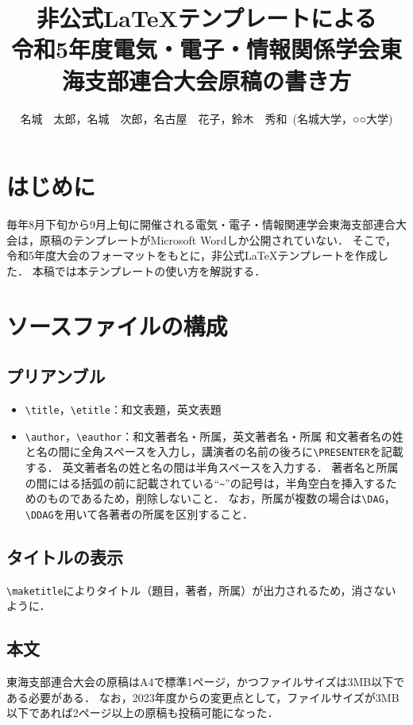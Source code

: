 \documentclass[a4j,9pt,twocolumn,uplatex]{jsarticle}
\title{非公式\LaTeX テンプレートによる\\令和5年度電気・電子・情報関係学会東海支部連合大会原稿の書き方}
\author{名城　太郎\DAG\PRESENTER，名城　次郎\DAG，名古屋　花子\DDAG，鈴木　秀和\DAG~(\DAG 名城大学，\DDAG ○○大学)}
\begin{document}
\maketitle		%

\setlength{\baselineskip}{14pt} %


\section{はじめに}

毎年8月下旬から9月上旬に開催される電気・電子・情報関連学会東海支部連合大会は，原稿のテンプレートがMicrosoft Wordしか公開されていない．
そこで，令和5年度大会のフォーマットをもとに，非公式\LaTeX テンプレートを作成した．
本稿では本テンプレートの使い方を解説する．


\section{ソースファイルの構成}

\subsection{プリアンブル}
\begin{itemize}
    \item \verb|\title|，\verb|\etitle|：和文表題，英文表題
    \item \verb|\author|，\verb|\eauthor|：和文著者名・所属，英文著者名・所属
    和文著者名の姓と名の間に全角スペースを入力し，講演者の名前の後ろに\verb|\PRESENTER|を記載する．
    英文著者名の姓と名の間は半角スペースを入力する．
    著者名と所属の間にはる括弧の前に記載されている``\verb|~|''の記号は，半角空白を挿入するためのものであるため，削除しないこと．
    なお，所属が複数の場合は\verb|\DAG|，\verb|\DDAG|を用いて各著者の所属を区別すること．
\end{itemize}

\subsection{タイトルの表示}
\verb|\maketitle|によりタイトル（題目，著者，所属）が出力されるため，消さないように．

\subsection{本文}
東海支部連合大会の原稿はA4で標準1ページ，かつファイルサイズは3MB以下である必要がある．
なお，2023年度からの変更点として，ファイルサイズが3MB以下であれば2ページ以上の原稿も投稿可能になった．
\end{document}
